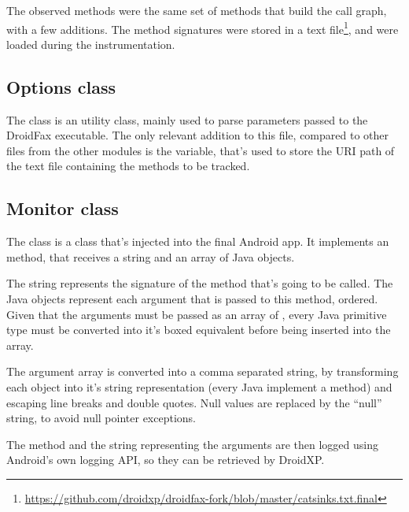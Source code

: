 The observed methods were the same set of methods that build the call graph, with a few additions. The method signatures were stored in a text file\footnote{\url{https://github.com/droidxp/droidfax-fork/blob/master/catsinks.txt.final}}, and were loaded during the instrumentation.

\subsection{Options class}

The  class is an utility class, mainly used to parse parameters passed to the DroidFax executable. The only relevant addition to this file, compared to other  files from the other modules is the  variable, that's used to store the URI path of the text file containing the methods to be tracked.

\subsection{Monitor class}

The  class is a class that's injected into the final Android app. It implements an  method, that receives a string and an array of Java objects.

The string represents the signature of the method that's going to be called. The Java objects represent each argument that is passed to this method, ordered. Given that the arguments must be passed as an array of , every Java primitive type must be converted into it's boxed equivalent before being inserted into the array.

The argument array is converted into a comma separated string, by transforming each object into it's string representation (every Java  implement a  method) and escaping line breaks and double quotes. Null values are replaced by the ``null'' string, to avoid null pointer exceptions. 

The method and the string representing the arguments are then logged using Android's own logging API, so they can be retrieved by DroidXP.

